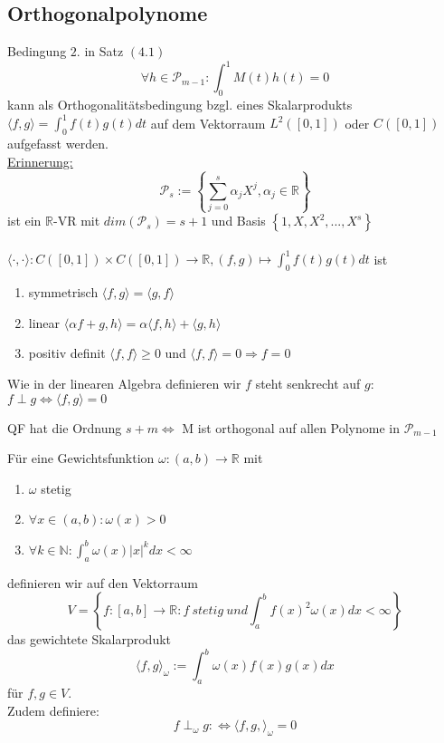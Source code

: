 \subsection{Orthogonalpolynome}
Bedingung $2.$ in Satz $(4.1)$ 
$$ \forall h \in \mathcal{P}_{m-1}: \int_0^1 M(t)h(t) = 0$$
kann als Orthogonalitätsbedingung bzgl. eines Skalarprodukts $\langle f, g\rangle = \int_0^1 f(t)g(t)dt$ auf dem Vektorraum $L^2([0,1])$ oder $C([0,1])$ aufgefasst werden. \\
\underline{Erinnerung:}
$$\mathcal{P}_s := \left\{ \sum_{j=0}^s \alpha_j X^j, \alpha_j \in \mathbb{R} \right\}$$ 
ist ein $\mathbb{R}$-VR mit $dim(\mathcal{P}_s) = s+1$ und Basis $\left\{ 1, X, X^2, ..., X^s \right\}$\\ \\
$\langle\cdot,\cdot\rangle : C([0,1]) \times C([0,1]) \rightarrow \mathbb{R}, (f, g) \mapsto \int_0^1 f(t)g(t)dt$ ist 
\begin{enumerate}
  \item symmetrisch $ \langle f, g\rangle = \langle g, f\rangle$
  \item linear $\langle \alpha f + g, h\rangle = \alpha \langle f, h\rangle + \langle g, h\rangle$
  \item positiv definit $\langle f, f\rangle \geq 0 $ und $ \langle f, f\rangle = 0 \Rightarrow f = 0$
\end{enumerate}
Wie in der linearen Algebra definieren wir $f$ steht senkrecht auf $g$: $f \perp g \Leftrightarrow \langle f, g\rangle = 0$

\begin{theorem}
QF hat die Ordnung $s+m \Leftrightarrow $ M ist orthogonal auf allen Polynome in $\mathcal{P}_{m-1}$
\end{theorem}

\begin{definition}
Für eine Gewichtsfunktion $\omega : (a, b) \rightarrow \mathbb{R}$ mit 
\begin{enumerate}
  \item $\omega$ stetig
  \item $\forall x\in(a,b): \omega(x) > 0 $
  \item $\forall k \in \mathbb{N}: \int_a^b \omega(x) \vert x \vert^k dx < \infty$
\end{enumerate}
definieren wir auf den Vektorraum 
$$ V = \left\{ f: [a,b] \rightarrow \mathbb{R}: f \medspace stetig \medspace und \int_a^b f(x)^2 \omega(x) dx < \infty \right\} $$
das gewichtete Skalarprodukt
$$ \langle f, g \rangle_\omega := \int_a^b \omega(x)f(x)g(x)dx$$
für $f, g \in V$. \\
Zudem definiere:
$$f \perp_\omega g :\Leftrightarrow \langle f, g, \rangle_\omega = 0$$
\end{definition}

